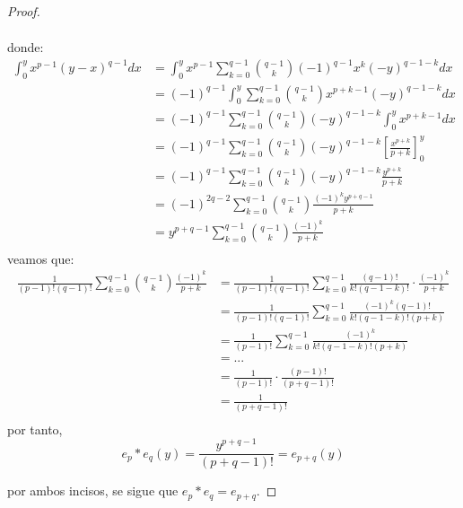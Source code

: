 \documentclass[12pt]{report}
\theoremstyle{largebreak}
\begin{document}
\begin{proof}
\begin{itemize}
\begin{equation*}
\begin{split}
                \end{split}
            \end{equation*}
            donde:
            \begin{equation*}
                \begin{split}
                    \int_{0}^y x^{p-1}(y-x)^{q-1}dx&=\int_0^yx^{p-1}\sum_{k=0}^{q-1}\binom{q-1}{k}(-1)^{q-1}x^k(-y)^{q-1-k}dx\\
                    &=(-1)^{q-1}\int_0^y\sum_{k=0}^{q-1}\binom{q-1}{k}x^{p+k-1}(-y)^{q-1-k}dx\\
                    &=(-1)^{q-1}\sum_{k=0}^{q-1}\binom{q-1}{k}(-y)^{q-1-k}\int_0^yx^{p+k-1}dx\\
                    &=(-1)^{q-1}\sum_{k=0}^{q-1}\binom{q-1}{k}(-y)^{q-1-k}\left[\frac{x^{p+k}}{p+k} \right]_0^y \\
                    &=(-1)^{q-1}\sum_{k=0}^{q-1}\binom{q-1}{k}(-y)^{q-1-k}\frac{y^{p+k}}{p+k} \\
                    &=(-1)^{2q-2}\sum_{k=0}^{q-1}\binom{q-1}{k}\frac{(-1)^ky^{p+q-1}}{p+k} \\
                    &=y^{p+q-1}\sum_{k=0}^{q-1}\binom{q-1}{k}\frac{(-1)^k}{p+k} \\
                \end{split}
            \end{equation*}
            veamos que:
            \begin{equation*}
                \begin{split}
                    \frac{1}{(p-1)!(q-1)!}\sum_{k=0}^{q-1}\binom{q-1}{k}\frac{(-1)^k}{p+k}
                    &=\frac{1}{(p-1)!(q-1)!}\sum_{k=0}^{q-1}\frac{(q-1)!}{k!(q-1-k)!}\cdot\frac{(-1)^k}{p+k}\\
                    &=\frac{1}{(p-1)!(q-1)!}\sum_{k=0}^{q-1}\frac{(-1)^k(q-1)!}{k!(q-1-k)!(p+k)} \\
                    &=\frac{1}{(p-1)!}\sum_{k=0}^{q-1}\frac{(-1)^k}{k!(q-1-k)!(p+k)} \\
                    &=...\\
                    &=\frac{1}{(p-1)!}\cdot\frac{(p-1)!}{(p+q-1)!} \\
                    &=\frac{1}{(p+q-1)!}\\
                \end{split}
            \end{equation*}
            por tanto,
            \begin{equation*}
                e_p*e_q(y)=\frac{y^{p+q-1}}{(p+q-1)!}=e_{p+q}(y)
            \end{equation*}
        \end{itemize}
        por ambos incisos, se sigue que $e_p*e_q=e_{p+q}$.


\end{proof}
\end{document}

